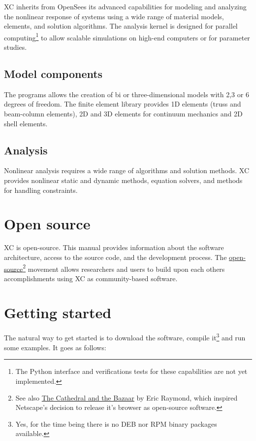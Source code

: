 XC inherits from OpenSees its advanced capabilities for modeling and analyzing the nonlinear response of systems using a wide range of material models, elements, and solution algorithms. The analysis kernel is designed for parallel computing\footnote{The Python interface and verifications tests for these capabilities are not yet implemented.} to allow scalable simulations on high-end computers or for parameter studies.

\subsection{Model components}

The programs allows the creation of bi or three-dimensional models with 2,3 or 6 degrees of freedom. The finite element library provides 1D elements (truss and beam-column elements), 2D and 3D elements for continuum mechanics and 2D shell elements.

\subsection{Analysis}
Nonlinear analysis requires a wide range of algorithms and solution methods. XC provides nonlinear static and dynamic methods, equation solvers, and methods for handling constraints.

\section{Open source}
XC is open-source. This manual provides information about the software architecture, access to the source code, and the development process. The \href{https://opensource.org/}{open-source}\footnote{See also \href{http://www.unterstein.net/su/docs/CathBaz.pdf}{The Cathedral and the Bazaar} by Eric Raymond, which inspired Netscape's decision to release it's browser as open-source software.} movement allows researchers and users to build upon each others accomplishments using XC as community-based software.

\section{Getting started}

The natural way to get started is to download the software, compile it\footnote{Yes, for the time being there is no DEB nor RPM binary packages available.} and run some examples. It goes as follows:

